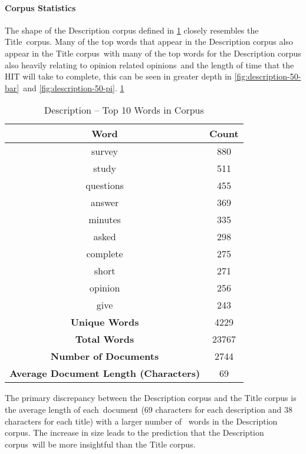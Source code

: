 \documentclass[letterpaper,12pt]{article}
\begin{document}
\paragraph{Corpus Statistics}
The shape of the Description corpus defined in \ref{tab:description_top_words} closely resembles the Title\
corpus. Many of the top words that appear in the Description corpus also appear in the Title corpus\
with many of the top words for the Description corpus also heavily relating to opinion related opinions\
and the length of time that the HIT will take to complete, this can be seen in greater depth in \ref{fig:description-50-bar}\
and \ref{fig:description-50-pi}.
\ref{tab:description_top_words}

\begin{table}
	\caption{\label{tab:description_top_words} Description -- Top 10 Words in Corpus}
	\begin{center}
		\begin{tabular}{|c|c|}
			\hline
			\textbf{Word} & \textbf{Count} \\
			\hline
			survey & 880 \\
			\hline
			study & 511 \\
			\hline
			questions & 455 \\
			\hline
			answer & 369 \\
			\hline
			minutes & 335 \\
			\hline
			asked & 298 \\
			\hline
			complete & 275 \\
			\hline
			short & 271 \\
			\hline
			opinion & 256 \\
			\hline
			give & 243 \\
			\hline
			\textbf{Unique Words} & 4229 \\
			\hline
			\textbf{Total Words} & 23767 \\
			\hline
			\textbf{Number of Documents} & 2744 \\
			\hline
			\textbf{Average Document Length (Characters)} & 69 \\
			\hline
		\end{tabular}
	\end{center}
\end{table}

The primary discrepancy between the Description corpus and the Title corpus is the average length of each\
document (69 characters for each description and 38 characters for each title) with a larger number of \
words in the Description corpus. The increase in size leads to the prediction that the Description corpus\
will be more insightful than the Title corpus.
\end{document}
